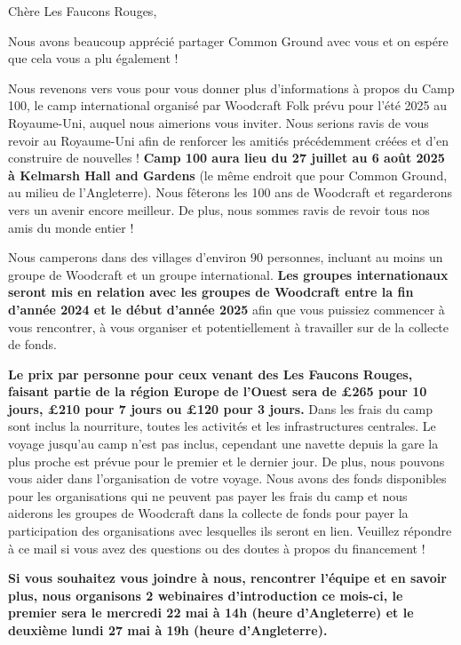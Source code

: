 \documentclass[a4paper, 11pt]{article}
\begin{document}
\makedocumenttitlepage

Ch\`ere Les Faucons Rouges,

Nous avons beaucoup appr\'eci\'e partager Common Ground avec vous et on esp\'ere que cela vous a plu \'egalement ! 

Nous revenons vers vous pour vous donner plus d'informations \`a propos du Camp 100, le camp international organis\'e par Woodcraft Folk pr\'evu pour l'\'et\'e 2025 au Royaume-Uni, auquel nous aimerions vous inviter. Nous serions ravis de vous revoir au Royaume-Uni afin de renforcer les amiti\'es pr\'ec\'edemment cr\'e\'ees et d'en construire de nouvelles ! \textbf{Camp 100 aura lieu du 27 juillet au 6 ao\^ut 2025 \`a Kelmarsh Hall and Gardens} (le m\^eme endroit que pour Common Ground, au milieu de l'Angleterre). Nous f\^eterons les 100 ans de Woodcraft et regarderons vers un avenir encore meilleur. De plus, nous sommes ravis de revoir tous nos amis du monde entier !

Nous camperons dans des villages d'environ 90 personnes, incluant au moins un groupe de Woodcraft et un groupe international. \textbf{Les groupes internationaux seront mis en relation avec les groupes de Woodcraft entre la fin d'ann\'ee 2024 et le d\'ebut d'ann\'ee 2025} afin que vous puissiez commencer \`a vous rencontrer, \`a vous organiser et potentiellement \`a travailler sur de la collecte de fonds.

\textbf{Le prix par personne pour ceux venant des Les Faucons Rouges, faisant partie de la r\'egion Europe de l'Ouest sera de £265 pour 10 jours, £210 pour 7 jours ou £120 pour 3 jours.} Dans les frais du camp sont inclus la nourriture, toutes les activit\'es et les infrastructures centrales. Le voyage jusqu'au camp n'est pas inclus, cependant une navette depuis la gare la plus proche est pr\'evue pour le premier et le dernier jour. De plus, nous pouvons vous aider dans l'organisation de votre voyage. Nous avons des fonds disponibles pour les organisations qui ne peuvent pas payer les frais du camp et nous aiderons les groupes de Woodcraft dans la collecte de fonds pour payer la participation des organisations avec lesquelles ils seront en lien. Veuillez r\'epondre \`a ce mail si vous avez des questions ou des doutes \`a propos du financement ! 

\textbf{Si vous souhaitez vous joindre \`a nous, rencontrer l'\'equipe et en savoir plus, nous organisons 2 webinaires d'introduction ce mois-ci, le premier sera le mercredi 22 mai \`a 14h (heure d'Angleterre) et le deuxième lundi 27 mai \`a 19h (heure d'Angleterre).}
\end{document}
